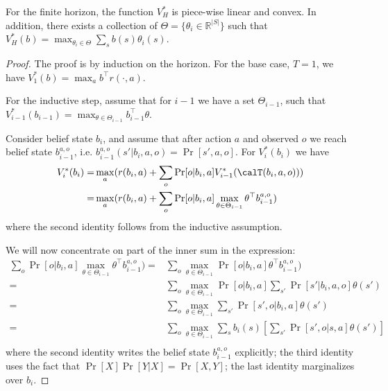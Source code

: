 \begin{theorem}
For the finite horizon, the function $V^*_H$ is piece-wise linear
and convex. In addition, there exists a collection of
$\Theta=\{\theta_i\in \mathbb{R}^{|S|}\}$ such that
$V^*_H(b)=\max_{\theta_i\in\Theta} \sum_s b(s)\theta_i(s)$.
\end{theorem}


\begin{proof}
The proof is by induction on the horizon. For the base case, $T=1$,
we have $V^*_1(b)=\max_a b^\top r(\cdot,a)$.

For the inductive step, assume that for $i-1$ we have a set
$\Theta_{i-1}$, such that $V^*_{i-1}(b_{i-1})=\max_{\theta\in\Theta_{i-1}}
b_{i-1}^\top \theta$.

Consider belief state $b_i$, and assume that after action $a$ and
observed $o$ we reach belief state $b^{a,o}_{i-1}$, i.e. $b^{a,o}_{i-1}(s'|b_i,a,o)=\Pr[s',a,o]$. For
$V^*_i(b_i)$ we have
\begin{align*}
V^*_i(b_i)=&\max_a (r(b_i,a)+\sum_o \Pr[o|b_i,a]V^*_{i-1}(\calT(b_i,a,o)))\\
=&\max_a (r(b_i,a)+\sum_o
\Pr[o|b_i,a]\max_{\theta\in\Theta_{i-1}}\theta^\top b_{i-1}^{a,o})
\end{align*}
where the second identity follows from the inductive assumption.

We will now concentrate on part of the inner sum in the expression:
\begin{align*}
\sum_o \Pr[o|b_i,a]\max_{\theta\in\Theta_{i-1}}\theta^\top b_{i-1}^{a,o}) =&
\sum_o \max_{\theta\in\Theta_{i-1}} \Pr[o|b_i,a]
\theta^\top b_{i-1}^{a,o})\\
=& \sum_o \max_{\theta\in\Theta_{i-1}} \Pr[o|b_i,a]
\sum_{s'}\Pr[s'|b_i,a,o]\theta(s')\\
=& \sum_o \max_{\theta\in\Theta_{i-1}} \sum_{s'} \Pr[s',o|b_i,a] \theta(s')\\
=& \sum_o \max_{\theta\in\Theta_{i-1}} \sum_s b_i(s) \left[\sum_{s'} \Pr[s',o|s,a] \theta(s')\right]\\
\end{align*}
where the second identity writes the belief state $b_{i-1}^{a,o}$ explicitly;
the third identity uses the fact that $\Pr[X]\Pr[Y|X]=\Pr[X,Y]$;
the last identity marginalizes over $b_i$.


\end{proof}
